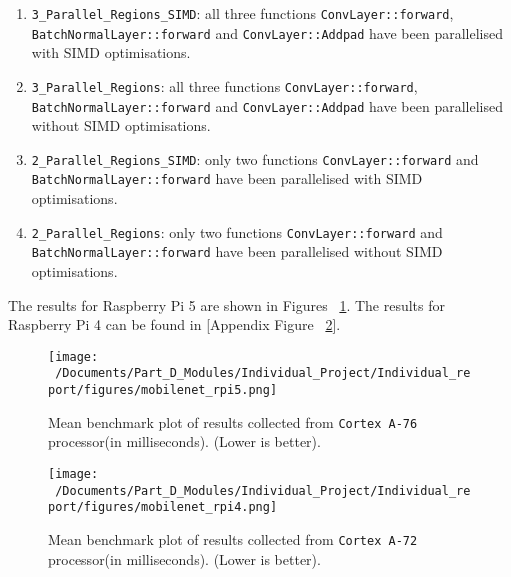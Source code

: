 \begin{enumerate}
	\item \texttt{3\_Parallel\_Regions\_SIMD}: all three functions \texttt{ConvLayer::forward}, \texttt{BatchNormalLayer::forward} and \texttt{ConvLayer::Addpad} have been parallelised with SIMD optimisations.
	\item \texttt{3\_Parallel\_Regions}: all three functions \texttt{ConvLayer::forward}, \texttt{BatchNormalLayer::forward} and \texttt{ConvLayer::Addpad} have been parallelised without SIMD optimisations.
	\item \texttt{2\_Parallel\_Regions\_SIMD}: only two functions \texttt{ConvLayer::forward} and \texttt{BatchNormalLayer::forward} have been parallelised with SIMD optimisations.
	\item \texttt{2\_Parallel\_Regions}: only two functions \texttt{ConvLayer::forward} and \texttt{BatchNormalLayer::forward} have been parallelised without SIMD optimisations.
\end{enumerate}

The results for Raspberry Pi 5 are shown in Figures ~\ref{fig:mobilenet_rpi5_plot}. The results for Raspberry Pi 4 can be found in [Appendix Figure ~\ref{fig:mobilenet_rpi4_plot}].

\begin{figure}[htbp] %
	\centering
	\texttt{[image: ~/Documents/Part\_D\_Modules/Individual\_Project/Individual\_report/figures/mobilenet\_rpi5.png]} %
	\caption{Mean benchmark plot of results collected from \texttt{Cortex A-76} processor(in milliseconds). (Lower is better).}
	\label{fig:mobilenet_rpi5_plot} %
\end{figure}

\begin{figure}[htbp] %
	\centering
	\texttt{[image: ~/Documents/Part\_D\_Modules/Individual\_Project/Individual\_report/figures/mobilenet\_rpi4.png]} %
	\caption{Mean benchmark plot of results collected from \texttt{Cortex A-72} processor(in milliseconds). (Lower is better).}
	\label{fig:mobilenet_rpi4_plot} %
\end{figure}

